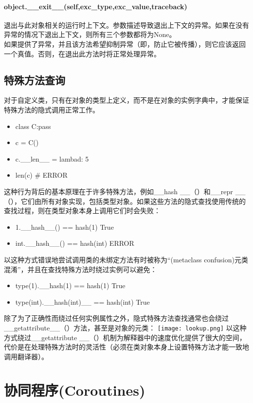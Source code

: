 \documentclass[10pt,UTF8]{ctexart}
\begin{document}
\begin{flushleft}
\paragraph{object.__exit__(self,exc_type,exc_value,traceback)}
退出与此对象相关的运行时上下文。参数描述导致退出上下文的异常。如果在没有异常的情况下退出上下文，则所有三个参数都将为None。\\
\indent 如果提供了异常，并且该方法希望抑制异常（即，防止它被传播），则它应该返回一个真值。否则，在退出此方法时将正常处理异常。
\subsection{特殊方法查询}
对于自定义类，只有在对象的类型上定义，而不是在对象的实例字典中，才能保证特殊方法的隐式调用正常工作。\\
\begin{itemize}
\item class C:pass
\item c = C()
\item c.__len__ = lambad: 5
\item len(c) \# ERROR
\end{itemize}
\indent 这种行为背后的基本原理在于许多特殊方法，例如__hash __（）和__repr __（），它们由所有对象实现，包括类型对象。如果这些方法的隐式查找使用传统的查找过程，则在类型对象本身上调用它们时会失败：\\
\begin{itemize}
\item 1.__hash__() == hash(1) True
\item int.__hash__() == hash(int) ERROR
\end{itemize}
以这种方式错误地尝试调用类的未绑定方法有时被称为“(metaclass confusion)元类混淆”，并且在查找特殊方法时绕过实例可以避免：
\begin{itemize}
\item type(1).__hash(1) == hash(1) True
\item type(int).__hash(int)__ == hash(int) True
\end{itemize}
除了为了正确性而绕过任何实例属性之外，隐式特殊方法查找通常也会绕过__getattribute__（）方法，甚至是对象的元类：
\texttt{[image: lookup.png]} 
以这种方式绕过__getattribute __（）机制为解释器中的速度优化提供了很大的空间，代价是在处理特殊方法时的灵活性（必须在类对象本身上设置特殊方法才能一致地调用翻译器）。

\section{协同程序(Coroutines)}

\end{flushleft}
\end{document}

